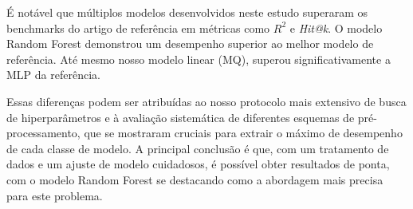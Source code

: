 \begin{table}[h!]
\centering
\caption{Comparativo de desempenho no conjunto de teste.}
\label{tab:final_comparison}
\end{table}

É notável que múltiplos modelos desenvolvidos neste estudo superaram os benchmarks do artigo de referência em métricas como $R^2$ e \emph{Hit@k}. O modelo Random Forest demonstrou um desempenho superior ao melhor modelo de referência. Até mesmo nosso modelo linear (MQ), superou significativamente a MLP da referência.

Essas diferenças podem ser atribuídas ao nosso protocolo mais extensivo de busca de hiperparâmetros e à avaliação sistemática de diferentes esquemas de pré-processamento, que se mostraram cruciais para extrair o máximo de desempenho de cada classe de modelo. A principal conclusão é que, com um tratamento de dados e um ajuste de modelo cuidadosos, é possível obter resultados de ponta, com o modelo Random Forest se destacando como a abordagem mais precisa para este problema.

